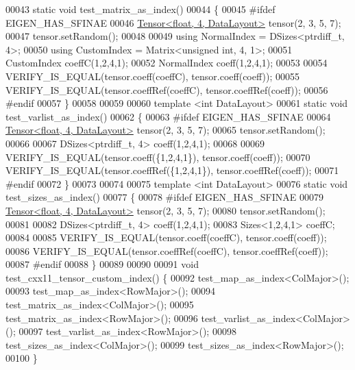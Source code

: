 \begin{DoxyCode}
00043 \textcolor{keyword}{static} \textcolor{keywordtype}{void} test\_matrix\_as\_index()
00044 \{
00045 \textcolor{preprocessor}{#ifdef EIGEN\_HAS\_SFINAE}
00046   \hyperlink{class_eigen_1_1_tensor}{Tensor<float, 4, DataLayout>} tensor(2, 3, 5, 7);
00047   tensor.setRandom();
00048 
00049   \textcolor{keyword}{using} NormalIndex = DSizes<ptrdiff\_t, 4>;
00050   \textcolor{keyword}{using} CustomIndex = Matrix<unsigned int, 4, 1>;
00051   CustomIndex coeffC(1,2,4,1);
00052   NormalIndex coeff(1,2,4,1);
00053 
00054   VERIFY\_IS\_EQUAL(tensor.coeff(coeffC), tensor.coeff(coeff));
00055   VERIFY\_IS\_EQUAL(tensor.coeffRef(coeffC), tensor.coeffRef(coeff));
00056 \textcolor{preprocessor}{#endif}
00057 \}
00058 
00059 
00060 \textcolor{keyword}{template} <\textcolor{keywordtype}{int} DataLayout>
00061 \textcolor{keyword}{static} \textcolor{keywordtype}{void} test\_varlist\_as\_index()
00062 \{
00063 \textcolor{preprocessor}{#ifdef EIGEN\_HAS\_SFINAE}
00064   \hyperlink{class_eigen_1_1_tensor}{Tensor<float, 4, DataLayout>} tensor(2, 3, 5, 7);
00065   tensor.setRandom();
00066 
00067   DSizes<ptrdiff\_t, 4> coeff(1,2,4,1);
00068 
00069   VERIFY\_IS\_EQUAL(tensor.coeff(\{1,2,4,1\}), tensor.coeff(coeff));
00070   VERIFY\_IS\_EQUAL(tensor.coeffRef(\{1,2,4,1\}), tensor.coeffRef(coeff));
00071 \textcolor{preprocessor}{#endif}
00072 \}
00073 
00074 
00075 \textcolor{keyword}{template} <\textcolor{keywordtype}{int} DataLayout>
00076 \textcolor{keyword}{static} \textcolor{keywordtype}{void} test\_sizes\_as\_index()
00077 \{
00078 \textcolor{preprocessor}{#ifdef EIGEN\_HAS\_SFINAE}
00079   \hyperlink{class_eigen_1_1_tensor}{Tensor<float, 4, DataLayout>} tensor(2, 3, 5, 7);
00080   tensor.setRandom();
00081 
00082   DSizes<ptrdiff\_t, 4> coeff(1,2,4,1);
00083   Sizes<1,2,4,1> coeffC;
00084 
00085   VERIFY\_IS\_EQUAL(tensor.coeff(coeffC), tensor.coeff(coeff));
00086   VERIFY\_IS\_EQUAL(tensor.coeffRef(coeffC), tensor.coeffRef(coeff));
00087 \textcolor{preprocessor}{#endif}
00088 \}
00089 
00090 
00091 \textcolor{keywordtype}{void} test\_cxx11\_tensor\_custom\_index() \{
00092   test\_map\_as\_index<ColMajor>();
00093   test\_map\_as\_index<RowMajor>();
00094   test\_matrix\_as\_index<ColMajor>();
00095   test\_matrix\_as\_index<RowMajor>();
00096   test\_varlist\_as\_index<ColMajor>();
00097   test\_varlist\_as\_index<RowMajor>();
00098   test\_sizes\_as\_index<ColMajor>();
00099   test\_sizes\_as\_index<RowMajor>();
00100 \}
\end{DoxyCode}
